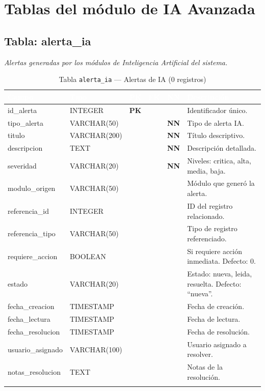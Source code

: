 \documentclass[11pt,a4paper]{article}
\newcommand{\tableheadrow}{\rowcolor{tableheader}}
\newcommand{\tablehead}[1]{\textcolor{white}{\textbf{#1}}}
\newcommand{\pk}{\textcolor{emiblue}{\textbf{PK}}}
\newcommand{\nn}{\textcolor{red!70!black}{\textbf{NN}}}
\begin{document}
\section{Tablas del módulo de IA Avanzada}

\subsection{Tabla: alerta\_ia}
\textit{Alertas generadas por los módulos de Inteligencia Artificial del sistema.}

\begin{longtable}{p{4.2cm} p{2.8cm} c c c p{4.5cm}}
\toprule
\tableheadrow
\tablehead{Campo} & \tablehead{Tipo} & \tablehead{PK} & \tablehead{FK} & \tablehead{NN} & \tablehead{Descripción} \\
\midrule
\endhead
id\_alerta & INTEGER & \pk & & & Identificador único. \\
\rowcolor{tablerow}
tipo\_alerta & VARCHAR(50) & & & \nn & Tipo de alerta IA. \\
titulo & VARCHAR(200) & & & \nn & Título descriptivo. \\
\rowcolor{tablerow}
descripcion & TEXT & & & \nn & Descripción detallada. \\
severidad & VARCHAR(20) & & & \nn & Niveles: critica, alta, media, baja. \\
\rowcolor{tablerow}
modulo\_origen & VARCHAR(50) & & & & Módulo que generó la alerta. \\
referencia\_id & INTEGER & & & & ID del registro relacionado. \\
\rowcolor{tablerow}
referencia\_tipo & VARCHAR(50) & & & & Tipo de registro referenciado. \\
requiere\_accion & BOOLEAN & & & & Si requiere acción inmediata. Defecto: 0. \\
\rowcolor{tablerow}
estado & VARCHAR(20) & & & & Estado: nueva, leida, resuelta. Defecto: ``nueva''. \\
fecha\_creacion & TIMESTAMP & & & & Fecha de creación. \\
\rowcolor{tablerow}
fecha\_lectura & TIMESTAMP & & & & Fecha de lectura. \\
fecha\_resolucion & TIMESTAMP & & & & Fecha de resolución. \\
\rowcolor{tablerow}
usuario\_asignado & VARCHAR(100) & & & & Usuario asignado a resolver. \\
notas\_resolucion & TEXT & & & & Notas de la resolución. \\
\bottomrule
\caption{Tabla \texttt{alerta\_ia} — Alertas de IA (0 registros)}
\end{longtable}
\end{document}
